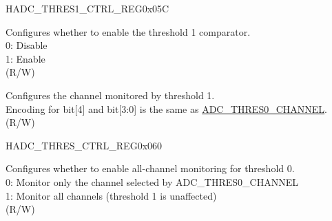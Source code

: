 \begin{register}{H}{ADC\_THRES1\_CTRL\_REG}{0x05C}\label{regdesc:ADCTHRES1CTRLREG}
%
%
%
\regnewline%
\begin{regdesc}\begin{reglist}
\label{fielddesc:ADCTHRES1EN}\item [ADC\_THRES1\_EN] Configures whether to enable the threshold 1 comparator.\\
0: Disable\\
1: Enable\\
(R/W)
\label{fielddesc:ADCTHRES1CHANNEL}\item [ADC\_THRES1\_CHANNEL] Configures the channel monitored by threshold 1.\\
Encoding for bit[4] and bit[3:0] is the same as \hyperref[fielddesc:ADCTHRES0CHANNEL]{ADC\_THRES0\_CHANNEL}.\\
(R/W)
\end{reglist}\end{regdesc}
\end{register}


\begin{register}{H}{ADC\_THRES\_CTRL\_REG}{0x060}\label{regdesc:ADCTHRESCTRLREG}
%
%
%
\regnewline%
\begin{regdesc}\begin{reglist}
\label{fielddesc:ADCTHRESALLEN}\item [ADC\_THRES\_ALL\_EN] Configures whether to enable all-channel monitoring for threshold 0.\\
0: Monitor only the channel selected by ADC\_THRES0\_CHANNEL\\
1: Monitor all channels (threshold 1 is unaffected)\\
(R/W)
\end{reglist}\end{regdesc}
\end{register}


